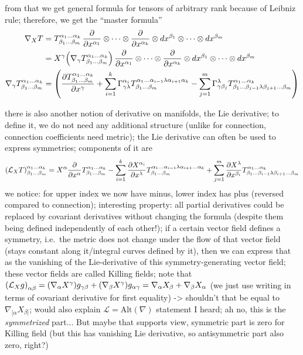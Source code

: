 \documentclass[ART_main.tex]{subfiles}
\begin{document}
from that we get general formula for tensors of arbitrary rank because of Leibniz rule; therefore, we get the \enquote{master formula}
\begin{align}
\nabla_X T &= T^{\alpha_1 \dots \alpha_k}_{\beta_1 \dots \beta_m} \, \pdv{x^{\alpha_1}} \otimes \dots \otimes \pdv{x^{\alpha_k}} \otimes dx^{\beta_1} \otimes \dots \otimes dx^{\beta_m}
\notag\\
&= X^\gamma \qty(\nabla_\gamma T^{\alpha_1 \dots \alpha_k}_{\beta_1 \dots \beta_m}) \, \pdv{x^{\alpha_1}} \otimes \dots \otimes \pdv{x^{\alpha_k}} \otimes dx^{\beta_1} \otimes \dots \otimes dx^{\beta_m}
\notag\\
\nabla_\gamma T^{\alpha_1 \dots \alpha_k}_{\beta_1 \dots \beta_m} &= \qty(\pdv{T^{\alpha_1 \dots \alpha_k}_{\beta_1 \dots \beta_m}}{x^\gamma} + \sum_{i = 1}^k \Gamma_{\gamma \lambda}^{\alpha_i} T^{\alpha_1 \dots \alpha_{i - 1} \lambda \alpha_{i + 1} \alpha_k}_{\beta_1 \dots \beta_m} - \sum_{j = 1}^m \Gamma_{\gamma \beta_j}^\lambda T^{\alpha_1 \dots \alpha_k}_{\beta_1 \dots \beta_{j - 1} \lambda \beta_{j + 1} \dots \beta_m})
\end{align}


there is also another notion of derivative on manifolds, the Lie derivative; to define it, we do not need any additional structure (unlike for connection, connection coefficients need metric); the Lie derivative can often be used to express symmetries; components of it are
\begin{equation}
\qty(\mathcal{L}_X T)^{\alpha_1 \dots \alpha_k}_{\beta_1 \dots \beta_m} = X^\alpha \pdv{x^\alpha} T^{\alpha_1 \dots \alpha_k}_{\beta_1 \dots \beta_m} - \sum_{i = 1}^k \pdv{X^{\alpha_i}}{x^\lambda} T^{\alpha_1 \dots \alpha_{i - 1} \lambda \alpha_{i + 1} \dots \alpha_k}_{\beta_1 \dots \beta_m} + \sum_{j = 1}^m \pdv{X^\lambda}{x^{\beta_i}} T^{\alpha_1 \dots \alpha_k}_{\beta_1 \dots \beta_{i - 1} \lambda \beta_{i + 1} \dots \beta_m}
\end{equation}
we notice: for upper index we now have minus, lower index has plus (reversed compared to connection); interesting property: all partial derivatives could be replaced by covariant derivatives without changing the formula (despite them being defined independently of each other!); if a certain vector field defines a symmetry, i.e.~the metric does not change under the flow of that vector field (stays constant along it/integral curves defined by it), then we can express that as the vanishing of the Lie-derivative of this symmetry-generating vector field; these vector fields are called Killing fields; note that $\qty(\mathcal{L}_X g)_{\alpha \beta} = \qty(\nabla_\alpha X^\gamma) g_{\gamma \beta} + \qty(\nabla_\beta X^\gamma) g_{\alpha \gamma} = \nabla_\alpha X_\beta + \nabla_\beta X_\alpha$ (we just use writing in terms of covariant derivative for first equality) -> shouldn't that be equal to $\nabla_{[\alpha} X_{\beta]}$; would also explain $\mathcal{L} = \text{Alt}(\nabla)$ statement I heard; ah no, this is the \emph{symmetrized} part... But maybe that supports view, symmetric part is zero for Killing field (but this has vanishing Lie derivative, so antisymmetric part also zero, right?)
\end{document}
